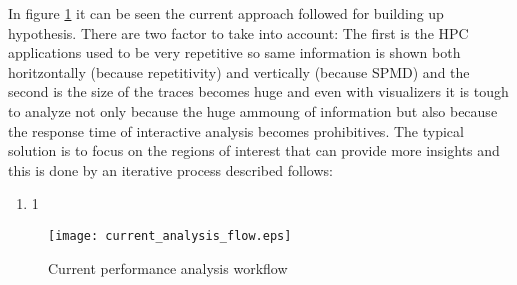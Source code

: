 In figure \ref{fig:currentAnalysisFlow} it can be seen the current approach
followed for building up hypothesis. There are two factor to take into account:
The first is the HPC applications used to be very repetitive so same information
is shown both horitzontally (because repetitivity) and vertically (because SPMD)
and the second is the size of the traces becomes huge and even with visualizers 
it is tough to analyze not only because the huge ammoung of information but also 
because the response time of interactive analysis becomes prohibitives. 
The typical solution is to focus on the regions of interest that can provide
more insights and this is done by an iterative process described follows:
\begin{enumerate}[label=\roman*)]
  \item 1
\end{enumerate}

\begin{figure}
  \caption{Current performance analysis workflow}
  \label{fig:currentAnalysisFlow}
  \centering
    \texttt{[image: current\_analysis\_flow.eps]}
\end{figure}




